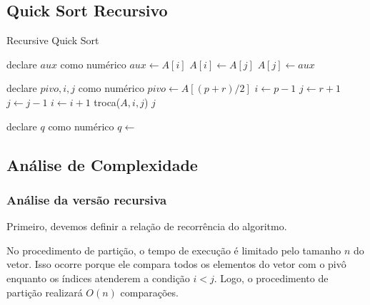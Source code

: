 \subsection{Quick Sort Recursivo}

\begin{algorithm}
	\caption{Recursive Quick Sort}
	\label{algo:bubble_sort}
	\begin{algorithmic}[1]
		\Statex
		\State declare $aux$ como numérico
		\State $aux \gets A[i]$
		\State $A[i] \gets A[j]$
		\State $A[j] \gets aux$
		\EndFunction
		\Statex

		\State declare $pivo, i, j$ como numérico
		\State $pivo \gets A[(p + r) / 2]$
		\State $i \gets p - 1$
		\State $j \gets r + 1$
		\Repeat
		\State $j \gets j - 1$
		\Repeat
		\State $i \gets i + 1$
		\State troca($A, i, j$)
		\EndIf
		\EndWhile
		\State \Return $j$
		\EndFunction
		\Statex

		\State declare $q$ como numérico
		\State $q \gets$ 
		\State {}
		\State {}
		\EndIf
		\EndFunction

	\end{algorithmic}
\end{algorithm}
\FloatBarrier

\newpage

\FloatBarrier

\subsection{Análise de Complexidade}

\subsubsection{Análise da versão recursiva}

Primeiro, devemos definir a relação de recorrência do algoritmo.

No procedimento de partição, o tempo de execução é limitado pelo tamanho \( n \) do vetor. Isso ocorre porque ele compara todos os elementos do vetor com o pivô enquanto os índices atenderem a condição \( i < j \). Logo, o procedimento de partição realizará \( O(n) \) comparações.

